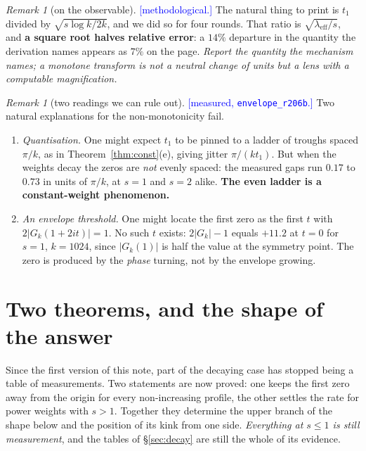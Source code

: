\documentclass[11pt,a4paper]{article}
\theoremstyle{plain}
\theoremstyle{definition}
\theoremstyle{remark}
\newtheorem{remark}[theorem]{Remark}
\newcommand{\STATUS}[1]{\textcolor{blue}{\textsf{[#1]}}}
\begin{document}
\begin{remark}[on the observable]\label{rem:observable}
\STATUS{methodological.}
The natural thing to print is $t_1$ divided by $\sqrt{s\log k/2k}$, and we did so for
four rounds. That ratio is $\sqrt{\lambda_{\mathrm{eff}}/s}$, and \textbf{a square root
halves relative error}: a $14\%$ departure in the quantity the derivation names appears
as $7\%$ on the page. \emph{Report the quantity the mechanism names; a monotone
transform is not a neutral change of units but a lens with a computable magnification.}
\end{remark}

\begin{remark}[two readings we can rule out]\label{rem:s1notes}
\STATUS{measured, \texttt{envelope\_r206b}.}
Two natural explanations for the non-monotonicity fail.
\begin{enumerate}
\item[(i)] \emph{Quantisation.} One might expect $t_1$ to be pinned to a ladder of
      troughs spaced $\pi/k$, as in Theorem~\ref{thm:const}(e), giving jitter
      $\pi/(kt_1)$. But when the weights decay the zeros are \emph{not} evenly spaced:
      the measured gaps run $0.17$ to $0.73$ in units of $\pi/k$, at $s=1$ and $s=2$
      alike. \textbf{The even ladder is a constant-weight phenomenon.}
\item[(ii)] \emph{An envelope threshold.} One might locate the first zero as the first
      $t$ with $2|G_k(1+2it)|=1$. No such $t$ exists: $2|G_k|-1$ equals $+11.2$ at
      $t=0$ for $s=1$, $k=1024$, since $|G_k(1)|$ is half the value at the symmetry
      point. The zero is produced by the \emph{phase} turning, not by the envelope
      growing.
\end{enumerate}
\end{remark}

\section{Two theorems, and the shape of the answer}\label{sec:twothm}

Since the first version of this note, part of the decaying case has stopped being a table
of measurements. Two statements are now proved: one keeps the first zero away from the
origin for every non-increasing profile, the other settles the rate for power weights with
$s>1$. Together they determine the upper branch of the shape below and the position of its
kink from one side. \emph{Everything at $s\le1$ is still measurement}, and the tables of
\S\ref{sec:decay} are still the whole of its evidence.
\end{document}
